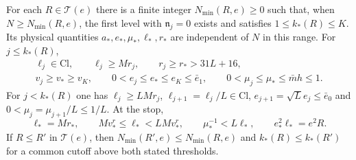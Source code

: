 \begin{proposition}\label{prop:rgfl-scales}
For each $R\in\mathcal T(e)$ there is a finite integer
$N_{\min}(R,e)\ge0$ such that, when $N\ge N_{\min}(R,e)$,
the first level with $\mathfrak n_j=0$ exists and
satisfies $1\le k_*(R)\le K$.
Its physical quantities $a_*,e_*,\mu_*,\ell_*,r_*$
are independent of $N$ in this range.
For $j\le k_*(R)$,
\begin{equation}\label{eq:rgfl-scale-ranges}
 \begin{gathered}
 \ell_j\in\mathrm{Cl},\qquad
 \ell_j\ge Mr_j,\qquad r_j\ge r_*>31L+16,\\
 v_j\ge v_*\ge v_K,\qquad
 0<e_j\le e_*\le e_K\le\bar e_1,\qquad
 0<\mu_j\le\mu_*\le\bar m h\le1 .
 \end{gathered}
\end{equation}
For $j<k_*(R)$ one has $\ell_j\ge LMr_j$,
$\ell_{j+1}=\ell_j/L\in\mathrm{Cl}$,
$e_{j+1}=\sqrt L e_j\le\bar e_0$ and
$0<\mu_j=\mu_{j+1}/L\le1/L$.
At the stop,
\begin{equation}\label{eq:rgfl-terminal-scales}
 \ell_*=Mr_*,\qquad
 Mv_*^r\le\ell_*<LMv_*^r,\qquad
 \mu_*^{-1}<L\ell_*,\qquad e_*^2\ell_*=e^2R.
\end{equation}
If $R\le R'$ in $\mathcal T(e)$, then
$N_{\min}(R',e)\le N_{\min}(R,e)$ and
$k_*(R)\le k_*(R')$ for a common cutoff above both stated thresholds.
\end{proposition}

